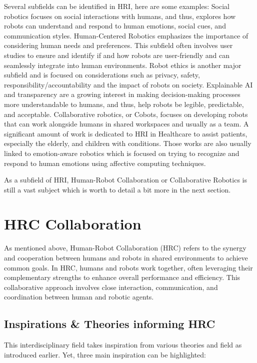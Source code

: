 Several subfields can be identified in HRI, here are some examples:
Social robotics focuses on social interactions with humans, and thus, explores how robots can understand and respond to human emotions, social cues, and communication styles.
Human-Centered Robotics emphasizes the importance of considering human needs and preferences. This subfield often involves user studies to ensure and identify if and how robots are user-friendly and can seamlessly integrate into human environments.
Robot ethics is another major subfield and is focused on considerations such as privacy, safety, responsibility/accountability and the impact of robots on society.
Explainable AI and transparency are a growing interest in making decision-making processes more understandable to humans, and thus, help robots be legible, predictable, and acceptable.
Collaborative robotics, or Cobots, focuses on developing robots that can work alongside humans in shared workspaces and usually as a team.
A significant amount of work is dedicated to HRI in Healthcare to assist patients, especially the elderly, and children with conditions. Those works are also usually linked to emotion-aware robotics which is focused on trying to recognize and respond to human emotions using affective computing techniques.   

As a subfield of HRI, Human-Robot Collaboration or Collaborative Robotics is still a vast subject which is worth to detail a bit more in the next section.

\section{HRC Collaboration}

As mentioned above, Human-Robot Collaboration (HRC) refers to the synergy and cooperation between humans and robots in shared environments to achieve common goals. In HRC, humans and robots work together, often leveraging their complementary strengths to enhance overall performance and efficiency. This collaborative approach involves close interaction, communication, and coordination between human and robotic agents.

\subsection{Inspirations \& Theories informing HRC}

This interdisciplinary field takes inspiration from various theories and field as introduced earlier. Yet, three main inspiration can be highlighted:

